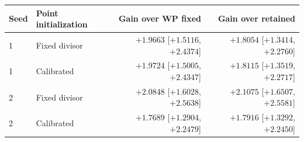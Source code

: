 \begin{tabular}{llrr}
\toprule
Seed & Point initialization & Gain over WP fixed & Gain over retained \\
\midrule
1 & Fixed divisor & $+1.9663$ [$+1.5116$, $+2.4374$] & $+1.8054$ [$+1.3414$, $+2.2760$] \\
1 & Calibrated & $+1.9724$ [$+1.5005$, $+2.4347$] & $+1.8115$ [$+1.3519$, $+2.2717$] \\
2 & Fixed divisor & $+2.0848$ [$+1.6028$, $+2.5638$] & $+2.1075$ [$+1.6507$, $+2.5581$] \\
2 & Calibrated & $+1.7689$ [$+1.2904$, $+2.2479$] & $+1.7916$ [$+1.3292$, $+2.2450$] \\
\bottomrule
\end{tabular}
